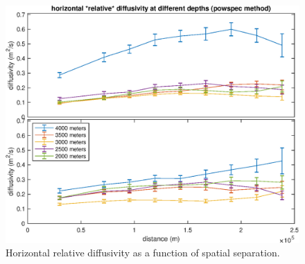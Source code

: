 \documentclass[10pt]{article}
\begin{document}
\begin{figure}[t]
  \centerline{\includegraphics[width=39pc,angle=0]{figures/DiffusivityVsScaleLinNonlin_relative_powspec}}
  \caption{Horizontal relative diffusivity as a function of spatial separation.}
  \label{DiffusivityVsScaleLinNonlin}
\end{figure}

{}
{\clearpage}


\end{document}
